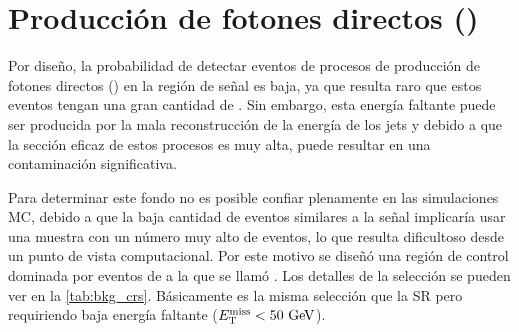 \section{Producción de fotones directos (\gjet)}
\label{sec:bkg_gjet}

Por diseño, la probabilidad de detectar eventos de procesos de producción de fotones
directos ({\gjet}) en la región de señal es
baja, ya que resulta raro que estos eventos tengan una gran cantidad de {\met}.
Sin embargo, esta energía faltante puede ser producida por la mala
reconstrucción de la energía de los jets y debido a que la sección eficaz de
estos procesos es muy alta, puede resultar en una contaminación significativa.

Para determinar este fondo no es posible confiar plenamente en las simulaciones
MC, debido a que la baja cantidad de eventos similares a la señal implicaría
usar una muestra con un número muy alto de eventos, lo que resulta dificultoso desde un
punto de vista computacional. Por este motivo se diseñó
una región de control dominada por eventos de {\gjet} a la que se llamó {\CRQ}.
Los detalles de la selección se pueden ver en la \cref{tab:bkg_crs}. Básicamente
es la misma selección que la SR pero requiriendo baja energía faltante ($\met <
50 \gev$).



